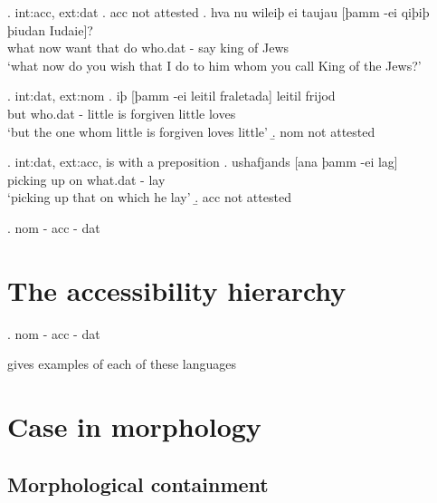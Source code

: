 \ex. \ac{int}:\ac{acc}, \ac{ext}:\ac{dat}
\a. \ac{acc} not attested
\bg. hva nu wileiþ ei taujau [þamm -ei qiþiþ þiudan Iudaie]?\\
 what now want that do\scsub{[dat]} who.\ac{dat} - say\scsub{[acc]} king {of Jews}\\
 `what now do you wish that I do to him whom you call King of the Jews?' 

\ex. \ac{int}:\ac{dat}, \ac{ext}:\ac{nom}
\ag. iþ [þamm -ei leitil fraletada] leitil frijod\\
 but who.\ac{dat} - little {is forgiven\scsub{[dat]}} little loves\scsub{[nom]}\\
 `but the one whom little is forgiven loves little' 
\b. \ac{nom} not attested

\ex. \ac{int}:\ac{dat}, \ac{ext}:\ac{acc}, is with a preposition
\ag. ushafjands [ana þamm -ei lag]\\
 {picking up}\scsub{[acc]} on\scsub{[dat]} what.\ac{dat} - lay\\
 `picking up that on which he lay' 
\b. \ac{acc} not attested



\ex. \ac{nom} - \ac{acc} - \ac{dat}

\phantom{nom}



\section{The accessibility hierarchy}

\ex. \ac{nom} - \ac{acc} - \ac{dat}

gives examples of each of these languages




\section{Case in morphology}

\subsection{Morphological containment}


